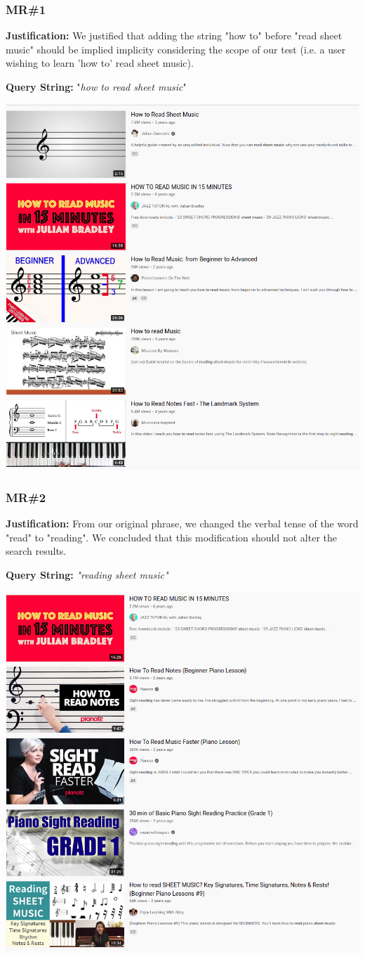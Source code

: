 \documentclass[12pt]{article}
\begin{document}
\subsubsection*{MR\#1}

\noindent
\textbf{Justification:} We justified that adding the string "how to" before "read sheet music" should be implied implicity considering the scope of our test (i.e. a user wishing to learn 'how to' read sheet music).

\noindent
\textbf{Query String:} "\textit{how to read sheet music}"

\begin{center}
    \includegraphics[width=0.5\columnwidth]{q3-mr1.png}
\end{center}

\newpage
\subsubsection*{MR\#2}

\noindent
\textbf{Justification:} From our original phrase, we changed the verbal tense of the word "read" to "reading". We concluded that this modification should not alter the search results.

\noindent
\textbf{Query String:} \textit{"reading sheet music"}

\begin{center}
    \includegraphics[width=0.5\columnwidth]{q3-mr2.png}
\end{center}
\end{document}
